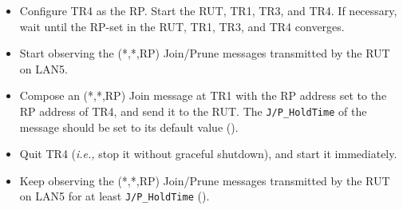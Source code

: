 \documentclass[11pt]{report}
\newcommand{\ie}{\emph{i.e.,}\xspace}
\begin{document}

\begin{itemize}

  \item Configure TR4 as the RP. Start the RUT, TR1, TR3, and TR4. If
  necessary, wait until the RP-set in the RUT, TR1, TR3, and TR4
  converges.

  \item Start observing the (*,*,RP) Join/Prune messages transmitted by the
  RUT on LAN5.

  \item Compose an (*,*,RP) Join message at TR1 with the RP address set to the
  RP address of TR4, and send it to the RUT. 
  The \verb=J/P_HoldTime= of the message should be set to its default
  value ({\PimsmJPHoldTime}).

  \item Quit TR4 (\ie stop it without graceful shutdown), and start it
  immediately.

  \item Keep observing the (*,*,RP) Join/Prune messages transmitted by the
  RUT on LAN5 for at least \verb=J/P_HoldTime= ({\PimsmJPHoldTime}).

\end{itemize}


\end{document}
